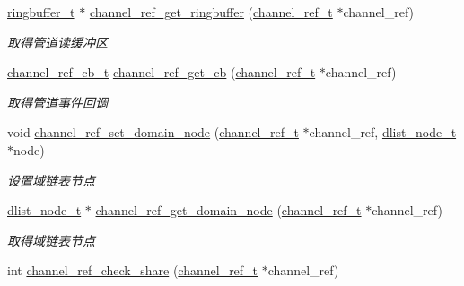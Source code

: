 \begin{DoxyCompactItemize}
\hyperlink{a00051_af929c5cf86b6a0f64dde407dfe60482e_af929c5cf86b6a0f64dde407dfe60482e}{ringbuffer\+\_\+t} $\ast$ \hyperlink{a00049_a7f81588a2beaa8c33a5eb7bf2236e566_a7f81588a2beaa8c33a5eb7bf2236e566}{channel\+\_\+ref\+\_\+get\+\_\+ringbuffer} (\hyperlink{a00051_a151271c9d188ef28d4d24bb81dcc1263_a151271c9d188ef28d4d24bb81dcc1263}{channel\+\_\+ref\+\_\+t} $\ast$channel\+\_\+ref)
\begin{DoxyCompactList}\small\item\em 取得管道读缓冲区 \end{DoxyCompactList}\item 
\hyperlink{a00051_ae296ec4d1ce108960de8dcc423956a1d_ae296ec4d1ce108960de8dcc423956a1d}{channel\+\_\+ref\+\_\+cb\+\_\+t} \hyperlink{a00049_a1495c5893bdd3bf7508c0d13c7a591a6_a1495c5893bdd3bf7508c0d13c7a591a6}{channel\+\_\+ref\+\_\+get\+\_\+cb} (\hyperlink{a00051_a151271c9d188ef28d4d24bb81dcc1263_a151271c9d188ef28d4d24bb81dcc1263}{channel\+\_\+ref\+\_\+t} $\ast$channel\+\_\+ref)
\begin{DoxyCompactList}\small\item\em 取得管道事件回调 \end{DoxyCompactList}\item 
void \hyperlink{a00049_a31d88025a8c93858b7784ce1f89cfffe_a31d88025a8c93858b7784ce1f89cfffe}{channel\+\_\+ref\+\_\+set\+\_\+domain\+\_\+node} (\hyperlink{a00051_a151271c9d188ef28d4d24bb81dcc1263_a151271c9d188ef28d4d24bb81dcc1263}{channel\+\_\+ref\+\_\+t} $\ast$channel\+\_\+ref, \hyperlink{a00051_a62053232bcf3566010ef98a7d77c3cc8_a62053232bcf3566010ef98a7d77c3cc8}{dlist\+\_\+node\+\_\+t} $\ast$node)
\begin{DoxyCompactList}\small\item\em 设置域链表节点 \end{DoxyCompactList}\item 
\hyperlink{a00051_a62053232bcf3566010ef98a7d77c3cc8_a62053232bcf3566010ef98a7d77c3cc8}{dlist\+\_\+node\+\_\+t} $\ast$ \hyperlink{a00049_ab5e94cb95124a4c5db7ddf5750a9bb17_ab5e94cb95124a4c5db7ddf5750a9bb17}{channel\+\_\+ref\+\_\+get\+\_\+domain\+\_\+node} (\hyperlink{a00051_a151271c9d188ef28d4d24bb81dcc1263_a151271c9d188ef28d4d24bb81dcc1263}{channel\+\_\+ref\+\_\+t} $\ast$channel\+\_\+ref)
\begin{DoxyCompactList}\small\item\em 取得域链表节点 \end{DoxyCompactList}\item 
int \hyperlink{a00049_ab71c6ed6109fedf4cf941b8de498a622_ab71c6ed6109fedf4cf941b8de498a622}{channel\+\_\+ref\+\_\+check\+\_\+share} (\hyperlink{a00051_a151271c9d188ef28d4d24bb81dcc1263_a151271c9d188ef28d4d24bb81dcc1263}{channel\+\_\+ref\+\_\+t} $\ast$channel\+\_\+ref)

\end{DoxyCompactItemize}
